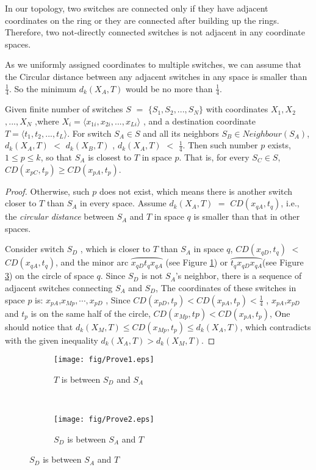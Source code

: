 \documentclass[10pt,conference]{IEEEtran}
\begin{document}
\begin{appendix}
In our topology, two switches are connected only if they
have adjacent coordinates on the ring or they are connected after building up the
rings. Therefore, two not-directly connected switches is not adjacent in any coordinate spaces.

As we uniformly assigned coordinates to multiple switches,
we can assume that the Circular distance between any adjacent switches in any space is smaller
than $\frac{1}{4}$. So the minimum $d_k(X_A,T)$ would be no more than $\frac{1}{4}$.

\label{prove:1}
\begin{mydef}
Given finite number of switches $S$ $ =$ $ \{S_1,S_2,...,S_N\}$
with coordinates $X_1,X_2$ $,...,X_N$
,where $X_i = \langle x_{1i}, x_{2i},...,x_{Li} \rangle $
, and a destination coordinate $T = \langle t_1,t_2,...,t_L \rangle $.
For switch $S_A \in S$ and all its neighbors $S_B \in Neighbour(S_A)$,
$d_k(X_A,T)$ $<$ $d_k(X_B,T)$ , $d_k(X_A,T)$ $<$ $\frac{1}{4}$.
Then such number $p$ exists, $1 \leq p \leq k$,
so that $S_A$ is closest to $T$ in space $p$. That is,
for every $S_C \in S$, $CD(x_{pC},t_p) \geq CD(x_{pA},t_p)$.
\end{mydef}

\begin{proof}
Otherwise, such $p$ does not exist, which means there is another switch closer to $T$ than $S_A$
 in every space. Assume $d_k(X_A,T) $ $ =$ $ CD(x_{qA},t_q)$, i.e.,
the \emph{circular distance} between $S_A$ and $T$ in space $q$ is
smaller than that in other spaces.

Consider switch $S_D$ , which is closer to $T$ than $S_A$ in space $q$,
$CD(x_{qD},t_q)$ $  < $ $CD(x_{qA},t_q)$, and  the minor arc $\wideparen{x_{qD}t_qx_{qA}} $ (see Figure \ref{fig:prove1})
or $\wideparen{t_qx_{qD}x_{qA}} $(see Figure \ref{fig:prove2}) on the circle of space $q$. Since $S_D$ is not
$S_A$'s neighbor, there is a sequence of adjacent switches connecting $S_A$ and
$S_D$, The coordinates of these switches in space $p$ is:
$x_{pA}$,$x_{Mp},\cdots,x_{pD}$ ,
 Since $CD(x_{pD},t_p) < CD(x_{pA},t_p)<\frac{1}{4}$ , $x_{pA}$,$x_{pD}$ and $t_p$ is on the same half of the circle,
$CD(x_{Mp},tp) < CD(x_{pA},t_p)$,
One should notice that $d_k(X_M,T) \leq CD(x_{Mp},t_p) \leq d_k(X_A,T)$,
which contradicts with the given inequality $d_k(X_A,T) > d_k(X_M,T)$.

\end{proof}
\begin{figure}[!h]
\centering
\begin{subfigure}[b]{0.4\linewidth}
                \texttt{[image: fig/Prove1.eps]}
                \caption{$T$ is between $S_D$ and $S_A$ }
                \label{fig:prove1}
\end{subfigure}
~
\begin{subfigure}[b]{0.4\linewidth}
                \texttt{[image: fig/Prove2.eps]}
                \caption{$S_D$ is between $S_A$ and $T$}
                \label{fig:prove2}
\end{subfigure}


\end{figure}
\end{appendix}
\end{document}
